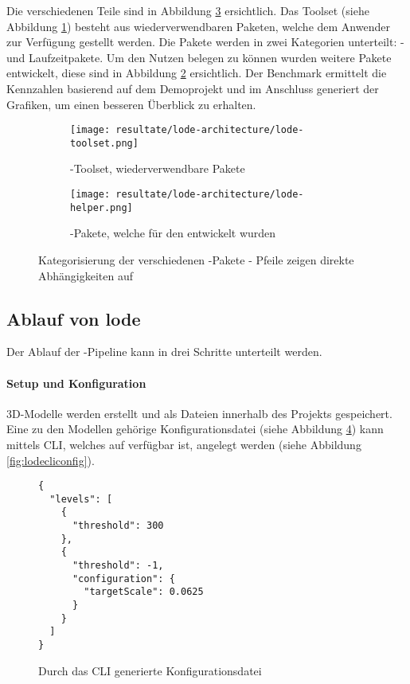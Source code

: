 Die verschiedenen Teile sind in Abbildung \ref{fig:lodePackages} ersichtlich. Das Toolset (siehe Abbildung \ref{fig:lodeToolset}) besteht aus wiederverwendbaren Paketen, welche dem Anwender zur Verfügung gestellt werden. Die Pakete werden in zwei Kategorien unterteilt: - und Laufzeitpakete. Um den Nutzen belegen zu können wurden weitere Pakete entwickelt, diese sind in Abbildung \ref{fig:lodeHelper} ersichtlich. Der Benchmark ermittelt die Kennzahlen basierend auf dem Demoprojekt und im Anschluss generiert der  Grafiken, um einen besseren Überblick zu erhalten.

\begin{figure}[H]
  \begin{subfigure}{.5\textwidth}
    \centering
    \texttt{[image: resultate/lode-architecture/lode-toolset.png]}
    \caption{-Toolset, wiederverwendbare Pakete}
    \label{fig:lodeToolset}
  \end{subfigure}%
  \begin{subfigure}{.5\textwidth}
    \centering
    \texttt{[image: resultate/lode-architecture/lode-helper.png]}
    \caption{-Pakete, welche für den  entwickelt wurden}
    \label{fig:lodeHelper}
  \end{subfigure}
  \caption{Kategorisierung der verschiedenen -Pakete - Pfeile zeigen direkte Abhängigkeiten auf}
  \label{fig:lodePackages}
\end{figure}

\subsection{Ablauf von lode}

Der Ablauf der -Pipeline kann in drei Schritte unterteilt werden.

\paragraph{Setup und Konfiguration}
3D-Modelle werden erstellt und als  Dateien innerhalb des Projekts gespeichert. Eine zu den Modellen gehörige Konfigurationsdatei (siehe Abbildung \ref{fig:lodeConfigFile}) kann mittels \gls{CLI}, welches auf  verfügbar ist, angelegt werden (siehe Abbildung \ref{fig:lodecliconfig}).

\begin{figure}[H]
  \begin{lstlisting}[style=json]
{
  "levels": [
    {
      "threshold": 300
    },
    {
      "threshold": -1,
      "configuration": {
        "targetScale": 0.0625
      }
    }
  ]
}
  \end{lstlisting}
\caption{Durch das CLI generierte Konfigurationsdatei}
\label{fig:lodeConfigFile}
\end{figure}


